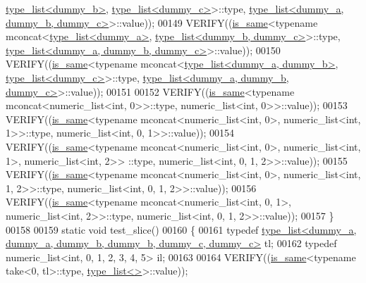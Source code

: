 \begin{DoxyCode}
      \hyperlink{struct_eigen_1_1internal_1_1type__list}{type\_list<dummy\_b>}, \hyperlink{struct_eigen_1_1internal_1_1type__list}{type\_list<dummy\_c>}>::type, 
      \hyperlink{struct_eigen_1_1internal_1_1type__list}{type\_list<dummy\_a, dummy\_b, dummy\_c>}>::value));
00149   VERIFY((\hyperlink{struct_eigen_1_1internal_1_1is__same}{is\_same}<\textcolor{keyword}{typename} mconcat<\hyperlink{struct_eigen_1_1internal_1_1type__list}{type\_list<dummy\_a>}, 
      \hyperlink{struct_eigen_1_1internal_1_1type__list}{type\_list<dummy\_b, dummy\_c>}>::type, 
      \hyperlink{struct_eigen_1_1internal_1_1type__list}{type\_list<dummy\_a, dummy\_b, dummy\_c>}>::value));
00150   VERIFY((\hyperlink{struct_eigen_1_1internal_1_1is__same}{is\_same}<\textcolor{keyword}{typename} mconcat<\hyperlink{struct_eigen_1_1internal_1_1type__list}{type\_list<dummy\_a, dummy\_b>}, 
      \hyperlink{struct_eigen_1_1internal_1_1type__list}{type\_list<dummy\_c>}>::type, 
      \hyperlink{struct_eigen_1_1internal_1_1type__list}{type\_list<dummy\_a, dummy\_b, dummy\_c>}>::value));
00151 
00152   VERIFY((\hyperlink{struct_eigen_1_1internal_1_1is__same}{is\_same}<\textcolor{keyword}{typename} mconcat<numeric\_list<int, 0>>::type, numeric\_list<int, 0>>::value));
00153   VERIFY((\hyperlink{struct_eigen_1_1internal_1_1is__same}{is\_same}<\textcolor{keyword}{typename} mconcat<numeric\_list<int, 0>, numeric\_list<int, 1>>::type, 
      numeric\_list<int, 0, 1>>::value));
00154   VERIFY((\hyperlink{struct_eigen_1_1internal_1_1is__same}{is\_same}<\textcolor{keyword}{typename} mconcat<numeric\_list<int, 0>, numeric\_list<int, 1>, numeric\_list<int, 2>>
      ::type, numeric\_list<int, 0, 1, 2>>::value));
00155   VERIFY((\hyperlink{struct_eigen_1_1internal_1_1is__same}{is\_same}<\textcolor{keyword}{typename} mconcat<numeric\_list<int, 0>, numeric\_list<int, 1, 2>>::type, 
      numeric\_list<int, 0, 1, 2>>::value));
00156   VERIFY((\hyperlink{struct_eigen_1_1internal_1_1is__same}{is\_same}<\textcolor{keyword}{typename} mconcat<numeric\_list<int, 0, 1>, numeric\_list<int, 2>>::type, 
      numeric\_list<int, 0, 1, 2>>::value));
00157 \}
00158 
00159 \textcolor{keyword}{static} \textcolor{keywordtype}{void} test\_slice()
00160 \{
00161   \textcolor{keyword}{typedef} \hyperlink{struct_eigen_1_1internal_1_1type__list}{type\_list<dummy\_a, dummy\_a, dummy\_b, dummy\_b, dummy\_c, dummy\_c>}
       tl;
00162   \textcolor{keyword}{typedef} numeric\_list<int, 0, 1, 2, 3, 4, 5> il;
00163 
00164   VERIFY((\hyperlink{struct_eigen_1_1internal_1_1is__same}{is\_same}<\textcolor{keyword}{typename} take<0, tl>::type, \hyperlink{struct_eigen_1_1internal_1_1type__list}{type\_list<>}>::value));

\end{DoxyCode}
